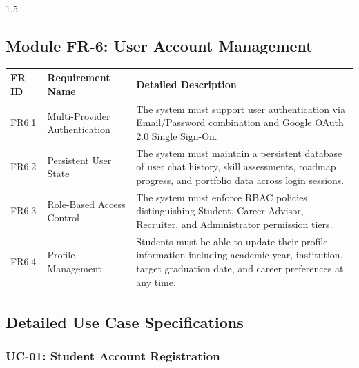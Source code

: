 \documentclass[12pt,a4paper]{report}
\begin{document}
\begin{spacing}{1.5}
		\subsection{Module FR-6: User Account Management}
		
		\begin{longtable}{|p{2cm}|p{4cm}|p{9cm}|}
			\hline
			\rowcolor{mainblue!15}\textbf{FR ID} & \textbf{Requirement Name} & \textbf{Detailed Description} \\ \hline
			FR6.1 & Multi-Provider Authentication & The system must support user authentication via Email/Password combination and Google OAuth 2.0 Single Sign-On. \\ \hline
			FR6.2 & Persistent User State & The system must maintain a persistent database of user chat history, skill assessments, roadmap progress, and portfolio data across login sessions. \\ \hline
			FR6.3 & Role-Based Access Control & The system must enforce RBAC policies distinguishing Student, Career Advisor, Recruiter, and Administrator permission tiers. \\ \hline
			FR6.4 & Profile Management & Students must be able to update their profile information including academic year, institution, target graduation date, and career preferences at any time. \\ \hline
		\end{longtable}
		
		\subsection{Detailed Use Case Specifications}
		
		\subsubsection{UC-01: Student Account Registration}
		

\end{spacing}
\end{document}
